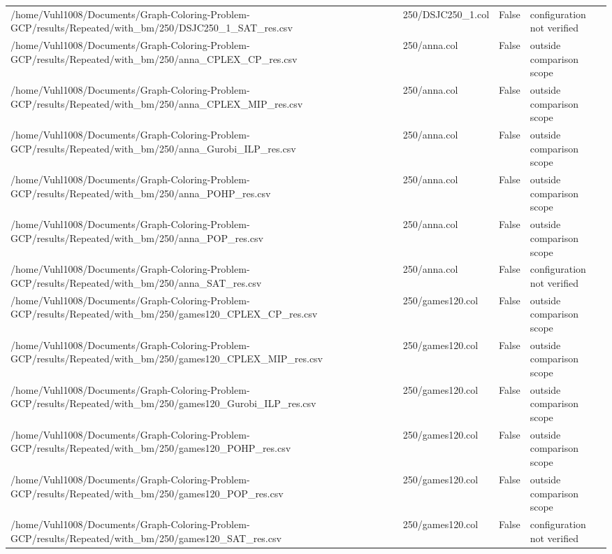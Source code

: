 \begin{table}[htbp]
\begin{tabular}{llll}
/home/Vuhl1008/Documents/Graph-Coloring-Problem-GCP/results/Repeated/with\_bm/250/DSJC250\_1\_SAT\_res.csv & 250/DSJC250\_1.col & False & configuration not verified \\
/home/Vuhl1008/Documents/Graph-Coloring-Problem-GCP/results/Repeated/with\_bm/250/anna\_CPLEX\_CP\_res.csv & 250/anna.col & False & outside comparison scope \\
/home/Vuhl1008/Documents/Graph-Coloring-Problem-GCP/results/Repeated/with\_bm/250/anna\_CPLEX\_MIP\_res.csv & 250/anna.col & False & outside comparison scope \\
/home/Vuhl1008/Documents/Graph-Coloring-Problem-GCP/results/Repeated/with\_bm/250/anna\_Gurobi\_ILP\_res.csv & 250/anna.col & False & outside comparison scope \\
/home/Vuhl1008/Documents/Graph-Coloring-Problem-GCP/results/Repeated/with\_bm/250/anna\_POHP\_res.csv & 250/anna.col & False & outside comparison scope \\
/home/Vuhl1008/Documents/Graph-Coloring-Problem-GCP/results/Repeated/with\_bm/250/anna\_POP\_res.csv & 250/anna.col & False & outside comparison scope \\
/home/Vuhl1008/Documents/Graph-Coloring-Problem-GCP/results/Repeated/with\_bm/250/anna\_SAT\_res.csv & 250/anna.col & False & configuration not verified \\
/home/Vuhl1008/Documents/Graph-Coloring-Problem-GCP/results/Repeated/with\_bm/250/games120\_CPLEX\_CP\_res.csv & 250/games120.col & False & outside comparison scope \\
/home/Vuhl1008/Documents/Graph-Coloring-Problem-GCP/results/Repeated/with\_bm/250/games120\_CPLEX\_MIP\_res.csv & 250/games120.col & False & outside comparison scope \\
/home/Vuhl1008/Documents/Graph-Coloring-Problem-GCP/results/Repeated/with\_bm/250/games120\_Gurobi\_ILP\_res.csv & 250/games120.col & False & outside comparison scope \\
/home/Vuhl1008/Documents/Graph-Coloring-Problem-GCP/results/Repeated/with\_bm/250/games120\_POHP\_res.csv & 250/games120.col & False & outside comparison scope \\
/home/Vuhl1008/Documents/Graph-Coloring-Problem-GCP/results/Repeated/with\_bm/250/games120\_POP\_res.csv & 250/games120.col & False & outside comparison scope \\
/home/Vuhl1008/Documents/Graph-Coloring-Problem-GCP/results/Repeated/with\_bm/250/games120\_SAT\_res.csv & 250/games120.col & False & configuration not verified \\

\end{tabular}
\end{table}
